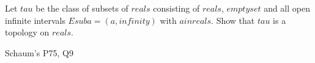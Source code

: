 \begin{samepage}
\begin{ex}
Let $tau$ be the class of subsets of $reals$ consisting of $reals$, $empty set$ and all open infinite intervals $E sub a = (a, infinity)$ with $a in reals$.
Show that $tau$ is a topology on $reals$.
\end{ex}
\begin{source}
Schaum's P75, Q9
\end{source}
\end{samepage}
